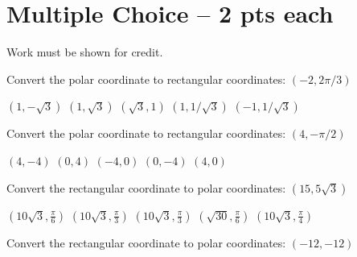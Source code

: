 \documentclass[11pt]{exam}
\begin{document}
\section*{Multiple Choice -- 2 pts each}
{\large Work must be shown for credit.}
\vspace{2ex}
\begin{questions}
	\begin{minipage}{\linewidth}
		\question Convert the polar coordinate to rectangular coordinates: $(-2, 2\pi/3)$

\begin{choices}
	\CorrectChoice $\left(1,-\sqrt{3}\right)$
	\choice $\left(1,\sqrt{3}\right)$
	\choice $\left(\sqrt{3},1\right)$
	\choice $\left(1,1/\sqrt{3}\right)$
	\choice $\left(-1,1/\sqrt{3}\right)$

\end{choices} \answerline
\end{minipage}

\begin{minipage}{\linewidth}
\question Convert the polar coordinate to rectangular coordinates: $(4,-\pi/2)$

\begin{choices}
	\choice $\left(4,-4\right)$
	\choice $\left(0,4\right)$
	\choice $\left(-4,0\right)$
	\CorrectChoice $\left(0,-4\right)$
	\choice $\left(4,0\right)$
\end{choices} \answerline
\end{minipage}

\begin{minipage}{\linewidth}



\question Convert the rectangular coordinate to polar coordinates: $(15, 5\sqrt{3})$

\begin{choices}
	\CorrectChoice $\left(10 \sqrt{3},\frac{\pi }{6}\right)$
	\choice $\left(10 \sqrt{3},\frac{\pi }{3}\right)$
	\choice $\left(10 \sqrt{3},\frac{\pi }{3}\right)$
	\choice $\left(\sqrt{30},\frac{\pi }{6}\right)$
	\choice $\left(10 \sqrt{3},\frac{\pi }{4}\right)$

\end{choices} \answerline
\end{minipage}

\begin{minipage}{\linewidth}



\question Convert the rectangular coordinate to polar coordinates: $(-12, -12)$


\end{minipage}
\end{questions}
\end{document}
